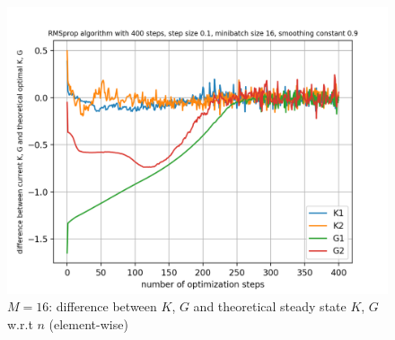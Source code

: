 \documentclass{article}
\begin{document}
\begin{figure}[h!]
\begin{minipage}[t]{.28\paperwidth}
		\includegraphics[width=1.0\textwidth]{Figures/d_M16_sep.png}
		\caption{$M=16$: difference between $K$, $G$ and theoretical steady state $K$, $G$ w.r.t $n$ (element-wise)}
	\end{minipage}
\end{figure}
\clearpage
\end{document}

